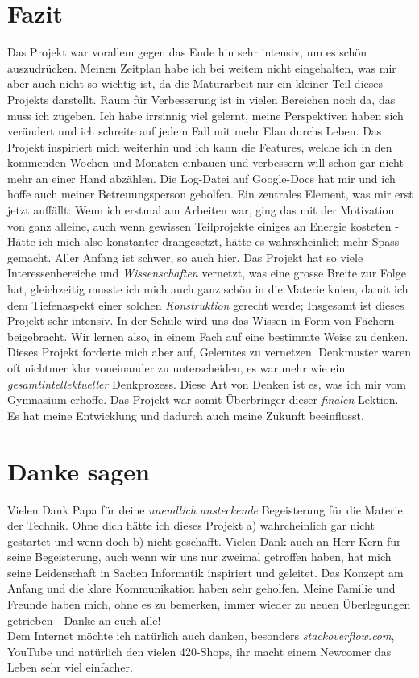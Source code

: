 \documentclass[12pt,titlepage,a4paper]{article}
\begin{document}
\section{Fazit}
Das Projekt war vorallem gegen das Ende hin sehr intensiv, um es schön auszudrücken. Meinen Zeitplan habe ich bei weitem nicht eingehalten, was mir aber auch nicht so wichtig ist, da die Maturarbeit nur ein kleiner Teil dieses Projekts darstellt. Raum für Verbesserung ist in vielen Bereichen noch da, das muss ich zugeben. Ich habe irrsinnig viel gelernt, meine Perspektiven haben sich verändert und ich schreite auf jedem Fall mit mehr Elan durchs Leben. Das Projekt inspiriert mich weiterhin und ich kann die Features, welche ich in den kommenden Wochen und Monaten einbauen und verbessern will schon gar nicht mehr an einer Hand abzählen. Die Log-Datei auf Google-Docs hat mir und ich hoffe auch meiner Betreuungsperson geholfen. Ein zentrales Element, was mir erst jetzt auffällt: Wenn ich erstmal am Arbeiten war, ging das mit der Motivation von ganz alleine, auch wenn gewissen Teilprojekte einiges an Energie kosteten - Hätte ich  mich also konstanter drangesetzt, hätte es wahrscheinlich mehr Spass gemacht. Aller Anfang ist schwer, so auch hier. Das Projekt hat so viele Interessenbereiche und \textit{Wissenschaften} vernetzt, was eine grosse Breite zur Folge hat, gleichzeitig musste ich mich auch ganz schön in die Materie knien, damit ich dem Tiefenaspekt einer solchen \textit{Konstruktion} gerecht werde; Insgesamt ist dieses Projekt sehr intensiv. In der Schule wird uns das Wissen in Form von Fächern beigebracht. Wir lernen also, in einem Fach auf eine bestimmte Weise zu denken. Dieses Projekt forderte mich aber auf, Gelerntes zu vernetzen. Denkmuster waren oft nichtmer klar voneinander zu unterscheiden, es war mehr wie ein \textit{gesamtintellektueller} Denkprozess. Diese Art von Denken ist es, was ich mir vom Gymnasium erhoffe. Das Projekt war somit Überbringer dieser \textit{finalen} Lektion. Es hat meine Entwicklung und dadurch auch meine Zukunft beeinflusst.



\section{Danke sagen}
Vielen Dank Papa für deine \textit{unendlich ansteckende} Begeisterung für die Materie der Technik. Ohne dich hätte ich dieses Projekt a) wahrcheinlich gar nicht gestartet und wenn doch b) nicht geschafft. Vielen Dank auch an Herr Kern für seine Begeisterung, auch wenn wir uns nur zweimal getroffen haben, hat mich seine Leidenschaft in Sachen Informatik inspiriert und geleitet. Das Konzept am Anfang und die klare Kommunikation haben sehr geholfen. Meine Familie und Freunde haben mich, ohne es zu bemerken, immer wieder zu neuen Überlegungen getrieben - Danke an euch alle!\\
Dem Internet möchte ich natürlich auch danken, besonders \textit{stackoverflow.com}, YouTube und natürlich den vielen 420-Shops, ihr macht einem Newcomer das Leben sehr viel einfacher.



\printglossary[title=Glossar, toctitle=Glossar]



%

\end{document}
